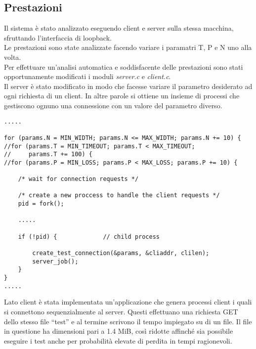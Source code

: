 \subsection{Prestazioni}
Il sistema è stato analizzato eseguendo client e server sulla stessa 
macchina, sfruttando l'interfaccia di loopback.\\
Le prestazioni sono state analizzate facendo variare i paramatri T, P e N
uno alla volta.\\
Per effettuare un'analisi automatica e soddisfacente delle prestazioni 
sono stati opportunamente modificati i moduli \emph{server.c} e 
\emph{client.c}.\\
Il server è stato modificato in modo che facesse variare il parametro
desiderato ad ogni richiesta di un client. In altre parole si ottiene
un insieme di processi che gestiscono ognuno una connessione con un valore
del parametro diverso.
\begin{lstlisting}[title=server\_test.c]
    .....

for (params.N = MIN_WIDTH; params.N <= MAX_WIDTH; params.N += 10) {
//for (params.T = MIN_TIMEOUT; params.T < MAX_TIMEOUT; 
//     params.T += 100) {
//for (params.P = MIN_LOSS; params.P < MAX_LOSS; params.P += 10) {

	/* wait for connection requests */

	/* create a new proccess to handle the client requests */
	pid = fork();

	.....

	if (!pid) {             // child process

		create_test_connection(&params, &cliaddr, clilen);
		server_job();
	}
}
.....
\end{lstlisting}
Lato client è stata implementata un'applicazione che genera processi 
client i quali si connettono sequenzialmente al server. Questi  
effettuano una richiesta GET dello stesso file ``test'' e al termine
scrivono il tempo impiegato su di un file.
Il file in questione ha dimensioni pari a 1.4 MiB, così ridotte 
affinché sia possibile eseguire i test anche per probabilità elevate di
perdita in tempi ragionevoli.
